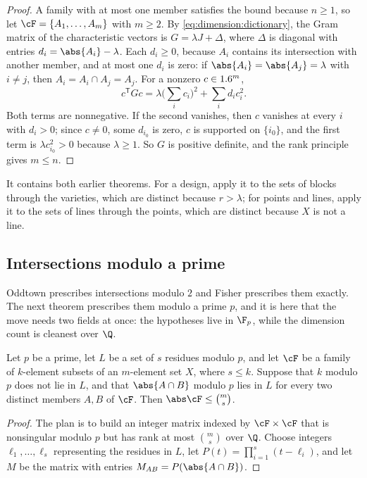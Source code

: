 \begin{refsection}
\begin{proof}
A family with at most one member satisfies the bound because $n\ge1$, so let $\cF=\{A_1,\dots,A_m\}$ with $m\ge2$. By \eqref{eq:dimension:dictionary}, the Gram matrix of the characteristic vectors is $G=\lambda J+\Delta$, where $\Delta$ is diagonal with entries $d_i=\abs{A_i}-\lambda$. Each $d_i\ge0$, because $A_i$ contains its intersection with another member, and at most one $d_i$ is zero: if $\abs{A_i}=\abs{A_j}=\lambda$ with $i\ne j$, then $A_i=A_i\cap A_j=A_j$. For a nonzero $c\in1.6^m$,
\[
c^{\mathsf T}Gc=\lambda\Big(\sum_i c_i\Big)^2+\sum_i d_ic_i^2 .
\]
Both terms are nonnegative. If the second vanishes, then $c$ vanishes at every $i$ with $d_i>0$; since $c\ne0$, some $d_{i_0}$ is zero, $c$ is supported on $\{i_0\}$, and the first term is $\lambda c_{i_0}^2>0$ because $\lambda\ge1$. So $G$ is positive definite, and the rank principle gives $m\le n$.
\end{proof}

It contains both earlier theorems. For a design, apply it to the sets of blocks through the varieties, which are distinct because $r>\lambda$; for points and lines, apply it to the sets of lines through the points, which are distinct because $X$ is not a line.

\subsection{Intersections modulo a prime}\label{sec:dimension:fw}

Oddtown prescribes intersections modulo $2$ and Fisher prescribes them exactly. The next theorem prescribes them modulo a prime $p$, and it is here that the move needs two fields at once: the hypotheses live in $\F_p$, while the dimension count is cleanest over $\Q$.

\begin{theorem}\label{thm:dimension:fw}
Let $p$ be a prime, let $L$ be a set of $s$ residues modulo $p$, and let $\cF$ be a family of $k$-element subsets of an $m$-element set $X$, where $s\le k$. Suppose that $k$ modulo $p$ does not lie in $L$, and that $\abs{A\cap B}$ modulo $p$ lies in $L$ for every two distinct members $A,B$ of $\cF$. Then $\abs\cF\le\binom ms$.
\end{theorem}

\begin{proof}
The plan is to build an integer matrix indexed by $\cF\times\cF$ that is nonsingular modulo $p$ but has rank at most $\binom ms$ over $\Q$. Choose integers $\ell_1,\dots,\ell_s$ representing the residues in $L$, let $P(t)=\prod_{i=1}^s(t-\ell_i)$, and let $M$ be the matrix with entries $M_{AB}=P(\abs{A\cap B})$.


\end{proof}
\end{refsection}
